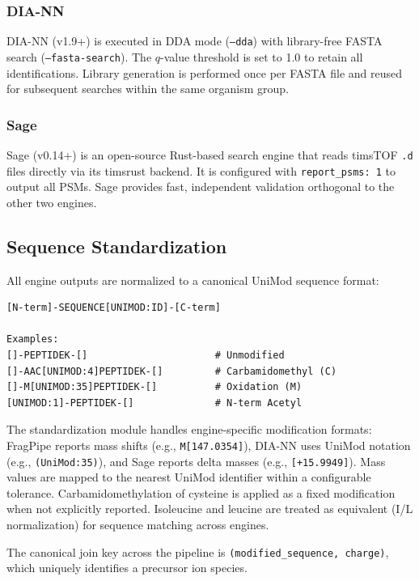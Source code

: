 \documentclass[10pt,twoside]{article}
\begin{document}
\subsubsection{DIA-NN}

DIA-NN (v1.9+) is executed in DDA mode (\texttt{--dda}) with library-free FASTA search (\texttt{--fasta-search}).
The $q$-value threshold is set to 1.0 to retain all identifications.
Library generation is performed once per FASTA file and reused for subsequent searches within the same organism group.

\subsubsection{Sage}

Sage (v0.14+) is an open-source Rust-based search engine that reads timsTOF \texttt{.d} files directly via its timsrust backend.
It is configured with \texttt{report\_psms: 1} to output all PSMs.
Sage provides fast, independent validation orthogonal to the other two engines.

\subsection{Sequence Standardization}

All engine outputs are normalized to a canonical UniMod sequence format:

\begin{verbatim}
[N-term]-SEQUENCE[UNIMOD:ID]-[C-term]

Examples:
[]-PEPTIDEK-[]                      # Unmodified
[]-AAC[UNIMOD:4]PEPTIDEK-[]         # Carbamidomethyl (C)
[]-M[UNIMOD:35]PEPTIDEK-[]          # Oxidation (M)
[UNIMOD:1]-PEPTIDEK-[]              # N-term Acetyl
\end{verbatim}

The standardization module handles engine-specific modification formats:
FragPipe reports mass shifts (e.g., \texttt{M[147.0354]}), DIA-NN uses UniMod notation (e.g., \texttt{(UniMod:35)}), and Sage reports delta masses (e.g., \texttt{[+15.9949]}).
Mass values are mapped to the nearest UniMod identifier within a configurable tolerance.
Carbamidomethylation of cysteine is applied as a fixed modification when not explicitly reported.
Isoleucine and leucine are treated as equivalent (I/L normalization) for sequence matching across engines.

The canonical join key across the pipeline is \texttt{(modified\_sequence, charge)}, which uniquely identifies a precursor ion species.
\end{document}
